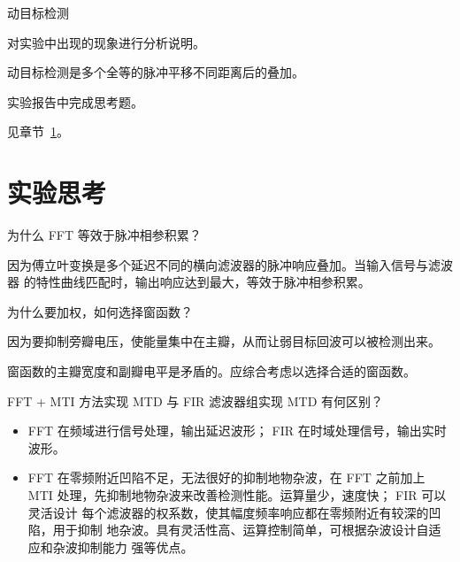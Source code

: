 \documentclass[../main]{subfiles}
\begin{document}
\begin{table}[htbp]
  \centering
  \caption{动目标检测}%
  \label{tab:mtd}
\end{table}


\begin{Exercise}
  对实验中出现的现象进行分析说明。
\end{Exercise}

\begin{Answer}
  动目标检测是多个全等的脉冲平移不同距离后的叠加。
\end{Answer}

\begin{Exercise}
  实验报告中完成思考题。
\end{Exercise}

\begin{Answer}
  见章节~\ref{sec:\arabic{chapter}thought}。
\end{Answer}

\section{实验思考}%
\label{sec:\arabic{chapter}thought}

\begin{Exercise}
  为什么 FFT 等效于脉冲相参积累？
\end{Exercise}

\begin{Answer}
  因为傅立叶变换是多个延迟不同的横向滤波器的脉冲响应叠加。当输入信号与滤波器
  的特性曲线匹配时，输出响应达到最大，等效于脉冲相参积累。
\end{Answer}

\begin{Exercise}
  为什么要加权，如何选择窗函数？
\end{Exercise}

\begin{Answer}
  因为要抑制旁瓣电压，使能量集中在主瓣，从而让弱目标回波可以被检测出来。

  窗函数的主瓣宽度和副瓣电平是矛盾的。应综合考虑以选择合适的窗函数。
\end{Answer}

\begin{Exercise}
  FFT + MTI 方法实现 MTD 与 FIR 滤波器组实现 MTD 有何区别？
\end{Exercise}

\begin{Answer}
  \begin{itemize}
    \item FFT 在频域进行信号处理，输出延迟波形； FIR 在时域处理信号，输出实时
      波形。
    \item FFT 在零频附近凹陷不足，无法很好的抑制地物杂波，在 FFT 之前加上 MTI
      处理，先抑制地物杂波来改善检测性能。运算量少，速度快； FIR 可以灵活设计
      每个滤波器的权系数，使其幅度频率响应都在零频附近有较深的凹陷，用于抑制
      地杂波。具有灵活性高、运算控制简单，可根据杂波设计自适应和杂波抑制能力
      强等优点。
  \end{itemize}
\end{Answer}
\end{document}
